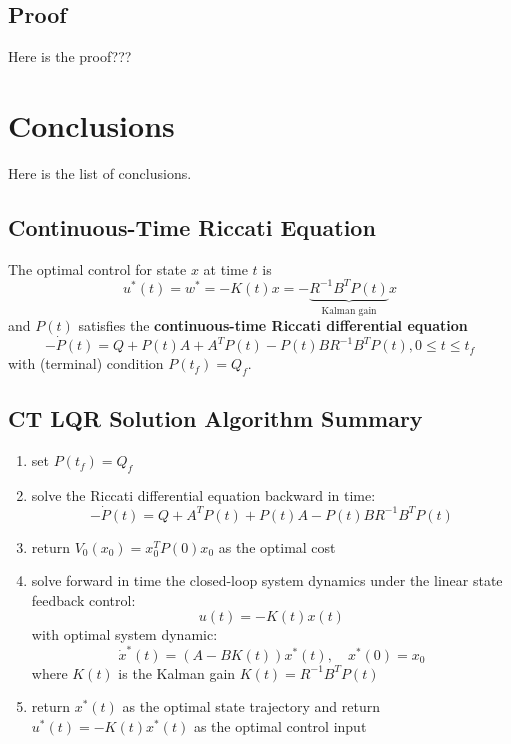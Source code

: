 \documentclass[10pt,a4paper,oneside]{article}
\begin{document}
\subsection{Proof}
Here is the proof???

\section{Conclusions}
Here is the list of conclusions.

\subsection{Continuous-Time Riccati Equation}
The optimal control for state $x$ at time $t$ is
\[
u^{*}(t)=w^{*}=-K(t) x=
-\underbrace{R^{-1} B^{T} P(t)}_{\text { Kalman gain }} x
\]
and $P(t)$ satisfies the {\bfseries continuous-time Riccati differential equation}
$$
-\dot{P}(t)=Q+P(t) A+A^{T} P(t)-P(t) B R^{-1} B^{T} P(t), 0 \leq t \leq t_{f}
$$
with (terminal) condition $P(t_f)=Q_f$.

\subsection{CT LQR Solution Algorithm Summary}

\begin{enumerate}
\item set $P(t_f)=Q_f$
\item solve the Riccati differential equation backward in time:
\[
-\dot{P}(t)=Q + A^{T} P(t) + P(t) A - P(t) B R^{-1} B^{T} P(t)
\]
\item return $V_0(x_0)=x_0^TP(0)x_0$ as the optimal cost
\item solve forward in time the closed-loop system dynamics under the linear state feedback control:
\[
u(t)=-K(t)x(t)
\]
with optimal system dynamic:
\[
\dot{x}^{*}(t)=(A-B K(t)) x^{*}(t), \quad x^{*}(0)=x_{0}
\]
where $K(t)$ is the Kalman gain $K(t)=R^{-1}B^T P(t)$
\item return $x^*(t)$ as the optimal state trajectory and return $u^*(t)=-K(t)x^*(t)$ as the optimal control input
\end{enumerate}
\end{document}
